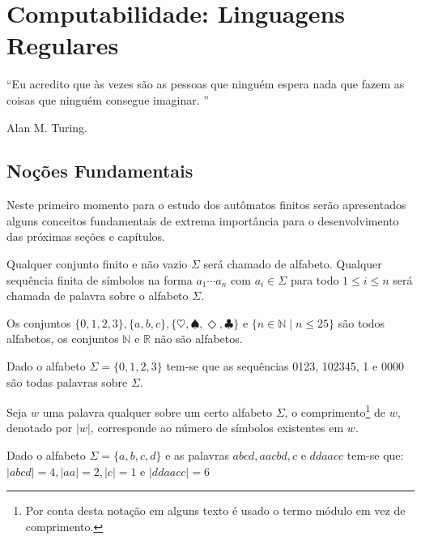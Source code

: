 \chapter{Computabilidade: Linguagens Regulares}\label{cap:LRegulares}

\epigraph{``Eu acredito que às vezes são as pessoas que ninguém espera nada que fazem as coisas que ninguém consegue imaginar. ''}{Alan M. Turing.}
 
\section{Noções Fundamentais}
 
Neste primeiro momento para o estudo dos autômatos finitos serão apresentados alguns conceitos fundamentais de extrema importância para o desenvolvimento das próximas seções e capítulos.

\begin{definition}\label{def:AlfabetoPalavra}
	\cite{valdi2016master} Qualquer conjunto finito e não vazio $\Sigma$ será chamado de alfabeto. Qualquer sequência finita de símbolos na forma $a_1\cdots a_n$ com $a_i \in \Sigma$ para todo $1 \leq i \leq n$ será chamada de palavra sobre o alfabeto $\Sigma$.
\end{definition}


\begin{exem}
	Os conjuntos $\{0, 1, 2, 3\}, \{a, b, c\}, \{\heartsuit,\spadesuit, \Diamond, \clubsuit\}$ e $\{n \in \mathbb{N} \mid n \leq 25\}$ são todos alfabetos, os conjuntos $\mathbb{N}$ e $\mathbb{R}$ não são alfabetos.
\end{exem}

\begin{exem}
	Dado o alfabeto $\Sigma = \{0, 1, 2, 3\}$ tem-se que as sequências 0123, 102345, 1 e 0000 são todas palavras sobre $\Sigma$.
\end{exem}

\begin{definition}\label{def:ComprimentoPalavra}
	Seja $w$ uma palavra qualquer sobre um certo alfabeto $\Sigma$, o comprimento\footnote{Por conta desta notação em alguns texto é usado o termo módulo em vez de comprimento.} de $w$, denotado por $|w|$, corresponde ao número de símbolos existentes em $w$.
\end{definition}

\begin{exem}
	Dado o alfabeto $\Sigma = \{a, b, c, d\}$ e as palavras $abcd, aacbd, c$ e $ddaacc$ tem-se que: $|abcd| = 4, |aa| = 2, |c| = 1$ e $|ddaacc| = 6$
\end{exem}

